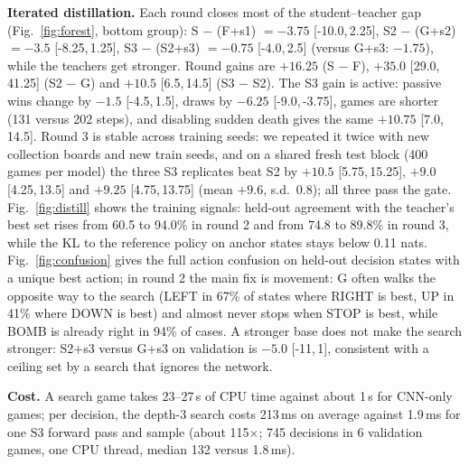 \documentclass[conference]{IEEEtran}
\newcommand{\ci}[2]{[#1,\,#2]}
\newcommand{\searchms}{213}
\newcommand{\cnnms}{1.9}
\newcommand{\speedratio}{115}
\begin{document}
\textbf{Iterated distillation.} Each round closes most of the student--teacher gap (Fig.~\ref{fig:forest}, bottom group): S $-$ (F+s1) $=-3.75$ \ci{-10.0}{2.25}, S2 $-$ (G+s2) $=-3.5$ \ci{-8.25}{1.25}, S3 $-$ (S2+s3) $=-0.75$ \ci{-4.0}{2.5} (versus G+s3: $-1.75$), while the teachers get stronger. Round gains are $+16.25$ (S $-$ F), $+35.0$ \ci{29.0}{41.25} (S2 $-$ G) and $+10.5$ \ci{6.5}{14.5} (S3 $-$ S2). The S3 gain is active: passive wins change by $-1.5$ \ci{-4.5}{1.5}, draws by $-6.25$ \ci{-9.0}{-3.75}, games are shorter (131 versus 202 steps), and disabling sudden death gives the same $+10.75$ \ci{7.0}{14.5}. Round 3 is stable across training seeds: we repeated it twice with new collection boards and new train seeds, and on a shared fresh test block (400 games per model) the three S3 replicates beat S2 by $+10.5$ \ci{5.75}{15.25}, $+9.0$ \ci{4.25}{13.5} and $+9.25$ \ci{4.75}{13.75} (mean $+9.6$, s.d.\ 0.8); all three pass the gate. Fig.~\ref{fig:distill} shows the training signals: held-out agreement with the teacher's best set rises from 60.5 to 94.0\% in round 2 and from 74.8 to 89.8\% in round 3, while the KL to the reference policy on anchor states stays below 0.11 nats. Fig.~\ref{fig:confusion} gives the full action confusion on held-out decision states with a unique best action; in round 2 the main fix is movement: G often walks the opposite way to the search (LEFT in 67\% of states where RIGHT is best, UP in 41\% where DOWN is best) and almost never stops when STOP is best, while BOMB is already right in 94\% of cases. A stronger base does not make the search stronger: S2+s3 versus G+s3 on validation is $-5.0$ \ci{-11}{1}, consistent with a ceiling set by a search that ignores the network.

\textbf{Cost.} A search game takes 23--27\,s of CPU time against about 1\,s for CNN-only games; per decision, the depth-3 search costs \searchms{}\,ms on average against \cnnms{}\,ms for one S3 forward pass and sample (about \speedratio{}$\times$; 745 decisions in 6 validation games, one CPU thread, median 132 versus 1.8\,ms).
\end{document}
